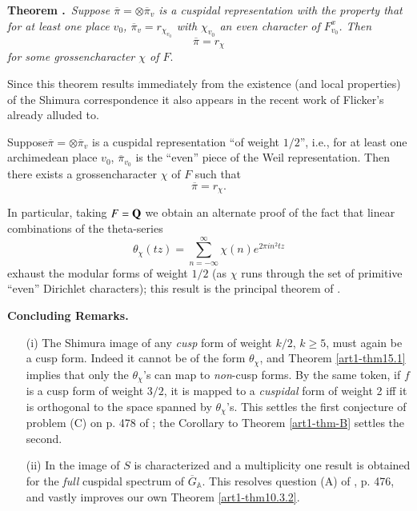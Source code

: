 \medskip
\noindent
{\bf Theorem .\label{art1-thm-B}}~{\em Suppose $\overline{\pi}=\otimes \overline{\pi}_{v}$ is a cuspidal representation with the property that for at least one place $v_{0}$, $\overline{\pi}_{v}=r_{\chi_{v_{0}}}$ with $\chi_{v_{0}}$ an even character of $F^{x}_{v_{0}}$. Then}
$$
\overline{\pi}=r_{\chi}
$$
{\em for some grossencharacter $\chi$ of $F$}.
\smallskip

Since this theorem results immediately from the existence (and local properties) of the Shimura correspondence it also appears in the recent work of Flicker's already alluded to.

\begin{coro*}
Suppose\pageoriginale $\overline{\pi}=\otimes \overline{\pi}_{v}$ is a cuspidal representation ``of weight $1/2$'', i.e., for at least one archimedean place $v_{0}$, $\overline{\pi}_{v_{0}}$ is the ``even'' piece of the Weil representation. Then there exists a grossencharacter $\chi$ of $F$ such that
$$
\overline{\pi}=r_{\chi}.
$$
\end{coro*}

In particular, taking $F=\mathbf{Q}$ we obtain an alternate proof of the fact that linear combinations of the theta-series
$$
\theta_{\chi}(tz)=\sum\limits^{\infty}_{n=-\infty}\chi(n)e^{2\pi in^{2}tz}
$$
exhaust the modular forms of weight $1/2$ (as $\chi$ runs through the set of primitive ``even'' Dirichlet characters); this result is the principal theorem of \cite{Serre-Stark}.

\medskip
\noindent
{\bf Concluding Remarks.}
\smallskip
\begin{itemize}
\item[(i)] The Shimura image of any {\em cusp} form of weight $k/2$, $k\geq 5$, must again be a cusp form. Indeed it cannot be of the form $\theta_{\chi}$, and Theorem \ref{art1-thm15.1} implies that only the $\theta_{\chi}$'s can map to {\em non}-cusp forms. By the same token, if $f$ is a cusp form of weight $3/2$, it is mapped to a {\em cuspidal} form of weight 2 iff it is orthogonal to the space spanned by $\theta_{\chi}$'s. This settles the first conjecture of problem (C) on p. 478 of \cite{Shim}; the Corollary to Theorem \ref{art1-thm-B} settles the second.

\item[(ii)] In \cite{Flicker} the image of $S$ is characterized and a multiplicity one result is obtained for the {\em full} cuspidal spectrum of $\overline{G}_{\mathbb{A}}$. This resolves question (A) of \cite{Shim}, p. 476, and vastly improves our own Theorem \ref{art1-thm10.3.2}.
\end{itemize}

